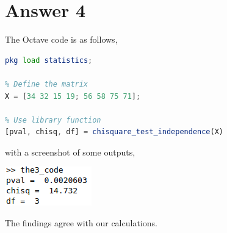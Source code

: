\documentclass[12pt]{article}
\begin{document}
\section*{Answer 4}

\noindent
The Octave code is as follows,
\begin{lstlisting}[language=Octave]
% Load statistics module for chi-square independence test
pkg load statistics;

% Define the matrix
X = [34 32 15 19; 56 58 75 71];

% Use library function
[pval, chisq, df] = chisquare_test_independence(X)
\end{lstlisting}

\noindent
with a screenshot of some outputs,

\begin{center}
  \includegraphics[scale = 1]{the3_output.png}
\end{center}

The findings agree with our calculations.
\end{document}
